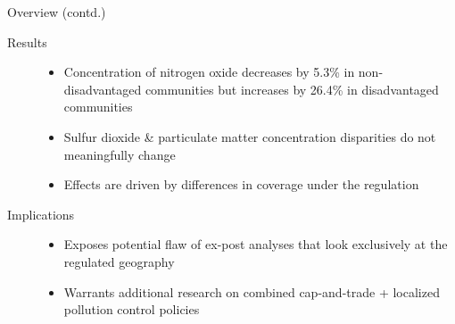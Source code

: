 \documentclass[11pt, aspectratio = 169]{beamer}
\newcommand{\1}{\mathds{1}}
\begin{document}
\begin{frame}{Overview (contd.)}
    
\begin{description}
    \item[Results]\begin{itemize}
        \item Concentration of nitrogen oxide decreases by 5.3\% in non-disadvantaged communities but increases by 26.4\% in disadvantaged communities
        \item Sulfur dioxide \& particulate matter concentration disparities do not meaningfully change
        \item Effects are driven by differences in coverage under the regulation  
    \end{itemize}
    \vfill
    \item[Implications]\begin{itemize}
        \item Exposes potential flaw of ex-post analyses that look exclusively at the regulated geography
        \item Warrants additional research on combined cap-and-trade + localized pollution control policies
    \end{itemize}
\end{description}

\end{frame}


    



\end{document}
